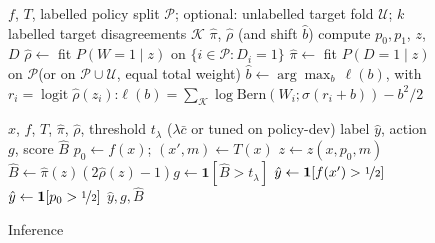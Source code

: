 \begin{figure}[t]
\begin{minipage}[t]{0.555\textwidth}
\begin{algorithm}[H]
\footnotesize
\caption{Training}
\label{alg:train}
\begin{algorithmic}[1]
\Require $f$, $T$, labelled policy split $\mathcal P$; optional: unlabelled target fold $\mathcal U$; $k$ labelled target disagreements $\mathcal K$
\Ensure $\hat\pi$, $\hat\rho$ (and shift $\hat b$)
 compute $p_0,p_1$, $z$, $D$ \EndFor
\State $\hat\rho\gets$ fit $P(W{=}1\mid z)$ on $\{i\in\mathcal P: D_i{=}1\}$
\State $\hat\pi\gets$ fit $P(D{=}1\mid z)$ on $\mathcal P$\Statex\hspace{\algorithmicindent}(or on $\mathcal P\cup\mathcal U$, equal total weight)
 
  \State $\hat b\gets\arg\max_b\,\ell(b)$, with $r_i=\operatorname{logit}\hat\rho(z_i)$:\Statex\hspace{\algorithmicindent}\hspace{\algorithmicindent}$\ell(b)=\sum_{\mathcal K}\log\mathrm{Bern}(W_i;\sigma(r_i{+}b))-b^2\!/2$
\EndIf
\end{algorithmic}
\end{algorithm}
\end{minipage}\hfill
\begin{minipage}[t]{0.43\textwidth}
\begin{algorithm}[H]
\footnotesize
\caption{Inference}
\label{alg:infer}
\begin{algorithmic}[1]
\Require $x$, $f$, $T$, $\hat\pi$, $\hat\rho$, threshold $t_\lambda$ ($\lambda\bar c$ or tuned on policy-dev)
\Ensure label $\hat y$, action $g$, score $\hat B$
\State $p_0\gets f(x)$; $(x',m)\gets T(x)$ \State $z\gets z(x,p_0,m)$
\State $\hat B\gets\hat\pi(z)(2\hat\rho(z)-1)$\State $g\gets\mathbf 1[\hat B>t_\lambda]$
 $\hat y\gets\mathbf 1[f(x')>\nicefrac12]$
\Else\ $\hat y\gets\mathbf 1[p_0>\nicefrac12]$ \EndIf
\State \Return $\hat y,g,\hat B$
\end{algorithmic}
\end{algorithm}
\end{minipage}
\end{figure}
